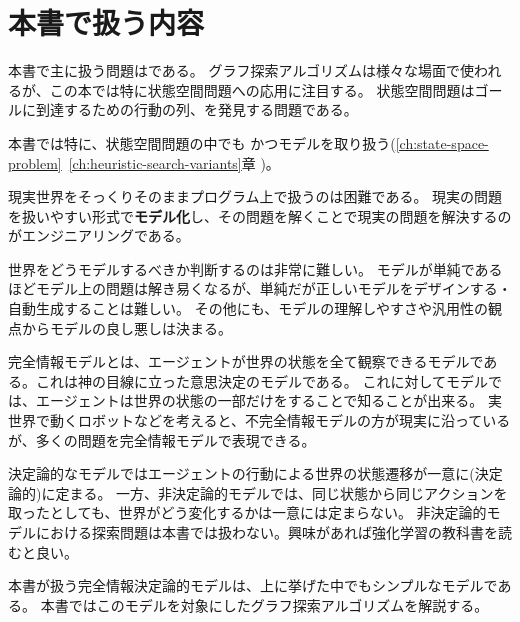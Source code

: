 \section{本書で扱う内容}
\label{sec:coverage}

本書で主に扱う問題はである。
グラフ探索アルゴリズムは様々な場面で使われるが、この本では特に状態空間問題への応用に注目する。
状態空間問題はゴールに到達するための行動の列、を発見する問題である。

本書では特に、状態空間問題の中でも
かつモデルを取り扱う(\ref{ch:state-space-problem}~\ref{ch:heuristic-search-variants}章
)。

現実世界をそっくりそのままプログラム上で扱うのは困難である。
現実の問題を扱いやすい形式で{\bf モデル化}し、その問題を解くことで現実の問題を解決するのがエンジニアリングである。

世界をどうモデルするべきか判断するのは非常に難しい。
モデルが単純であるほどモデル上の問題は解き易くなるが、単純だが正しいモデルをデザインする・自動生成することは難しい。
その他にも、モデルの理解しやすさや汎用性の観点からモデルの良し悪しは決まる。

完全情報モデルとは、エージェントが世界の状態を全て観察できるモデルである。これは神の目線に立った意思決定のモデルである。
これに対してモデルでは、エージェントは世界の状態の一部だけをすることで知ることが出来る。
実世界で動くロボットなどを考えると、不完全情報モデルの方が現実に沿っているが、多くの問題を完全情報モデルで表現できる。

決定論的なモデルではエージェントの行動による世界の状態遷移が一意に(決定論的)に定まる。
一方、非決定論的モデルでは、同じ状態から同じアクションを取ったとしても、世界がどう変化するかは一意には定まらない。
非決定論的モデルにおける探索問題は本書では扱わない。興味があれば強化学習の教科書を読むと良い\cite{sutton1998introduction}。


本書が扱う完全情報決定論的モデルは、上に挙げた中でもシンプルなモデルである。
本書ではこのモデルを対象にしたグラフ探索アルゴリズムを解説する。

